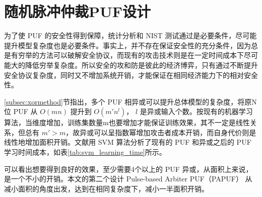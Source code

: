 
\chapter{随机脉冲仲裁PUF设计}\label{chap:rpapuf}
为了使 PUF 的安全性得到保障，统计分析和 NIST 测试通过是必要条件，尽可能提升模型复杂度也是必要条件。事实上，并不存在保证安全性的充分条件，因为总是有穷举的方法可以破解安全协议，而现有的攻击技术则是在一定时间成本下尽可能大的降低穷举复杂度。所以安全的攻和防是彼此的经济博弈，只有通过不断提升安全协议复杂度，同时又不增加系统开销，才能保证在相同经济能力下的相对安全性。

\ref{subsec:xormethod}节指出，多个 PUF 相异或可以提升总体模型的复杂度，将原N位 PUF 从 $ O(mn) $ 提升到 $ O(m'n^l) $， $ l $ 是异或输入个数。按现有的机器学习算法，当维度增加，训练集数量m也要增加才能保证训练效果，其不一定是线性关系，但总有 $ m'>m $，故异或可以呈指数幂增加攻击者成本开销，而自身代价则是线性地增加面积开销。文献\parencite{mahmoud2013combined}用 SVM 算法分析了现有的 PUF 和异或之后的 PUF 学习时间成本，如表\ref{tab:svm_learning_time}所示。

可以看出想要得到良好的效果，至少需要4个以上的 PUF 异或，从面积上来说，是一个不小的开销。本文的第二个设计 Pulse-based Arbiter PUF（PAPUF） 从减小面积的角度出发，达到在相同复杂度下，减小一半面积开销。

